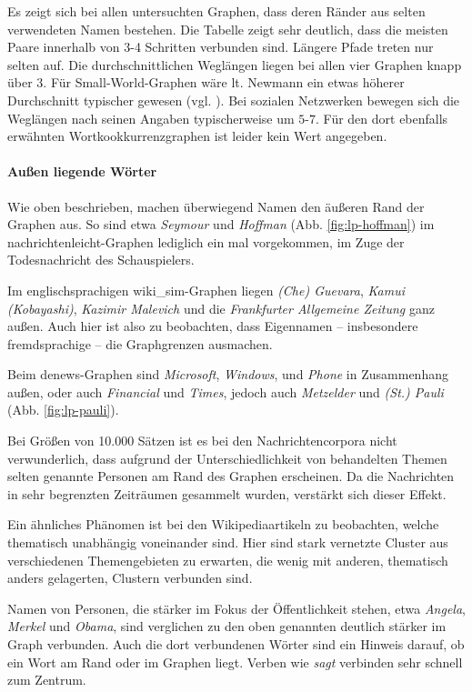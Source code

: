 \documentclass[11pt, a4paper]{article}
\begin{document}
Es zeigt sich bei allen untersuchten Graphen, dass deren Ränder aus selten verwendeten Namen bestehen.
Die Tabelle zeigt sehr deutlich, dass die meisten Paare innerhalb von 3-4 Schritten verbunden sind.
Längere Pfade treten nur selten auf.
Die durchschnittlichen Weglängen liegen bei allen vier Graphen knapp über 3.
Für Small-World-Graphen wäre lt. Newmann ein etwas höherer Durchschnitt typischer gewesen (vgl. \cite{Newman2003}).
Bei sozialen Netzwerken bewegen sich die Weglängen nach seinen Angaben typischerweise um $5$-$7$.
Für den dort ebenfalls erwähnten Wortkookkurrenzgraphen ist leider kein Wert angegeben.

\paragraph{Außen liegende Wörter}
Wie oben beschrieben, machen überwiegend Namen den äußeren Rand der Graphen aus.
So sind etwa \emph{Seymour} und \emph{Hoffman} (Abb. \ref{fig:lp-hoffman}) im nachrichtenleicht-Graphen lediglich ein mal vorgekommen, im Zuge der Todesnachricht des Schauspielers.

Im englischsprachigen wiki\_sim-Graphen liegen \emph{(Che) Guevara}, \emph{Kamui (Kobayashi)}, \emph{Kazimir Malevich} und die \emph{Frankfurter Allgemeine Zeitung} ganz außen.
Auch hier ist also zu beobachten, dass Eigennamen -- insbesondere fremdsprachige -- die Graphgrenzen ausmachen.

Beim denews-Graphen sind \emph{Microsoft}, \emph{Windows}, und \emph{Phone} in Zusammenhang außen, oder auch \emph{Financial} und \emph{Times}, jedoch auch \emph{Metzelder} und \emph{(St.) Pauli} (Abb. \ref{fig:lp-pauli}).

Bei Größen von 10.000 Sätzen ist es bei den Nachrichtencorpora nicht verwunderlich, dass aufgrund der Unterschiedlichkeit von behandelten Themen selten genannte Personen am Rand des Graphen erscheinen.
Da die Nachrichten in sehr begrenzten Zeiträumen gesammelt wurden, verstärkt sich dieser Effekt.

Ein ähnliches Phänomen ist bei den Wikipediaartikeln zu beobachten, welche thematisch unabhängig voneinander sind.
Hier sind stark vernetzte Cluster aus verschiedenen Themengebieten zu erwarten, die wenig mit anderen, thematisch anders gelagerten, Clustern verbunden sind.

Namen von Personen, die stärker im Fokus der Öffentlichkeit stehen, etwa \emph{Angela}, \emph{Merkel} und \emph{Obama}, sind verglichen zu den oben genannten deutlich stärker im Graph verbunden.
Auch die dort verbundenen Wörter sind ein Hinweis darauf, ob ein Wort am Rand oder im Graphen liegt.
Verben wie \emph{sagt} verbinden sehr schnell zum Zentrum.
\end{document}
